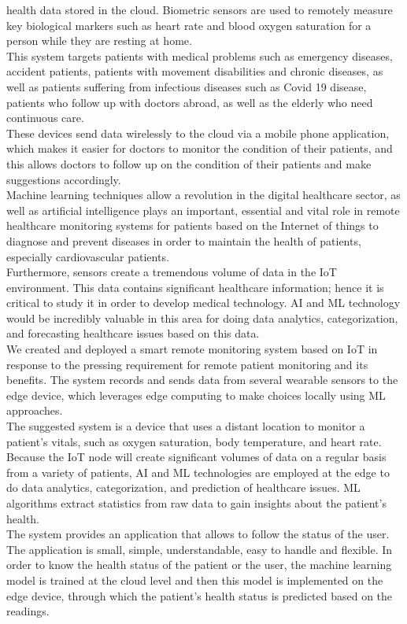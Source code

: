 \documentclass{bmcart}
\begin{document}
health data stored in the cloud. Biometric sensors are used to remotely measure
key biological markers such as heart rate and blood oxygen saturation for a
person while they are resting at home.\\
This system targets patients with medical problems such as emergency diseases,
accident patients, patients with movement disabilities and chronic diseases, as
well as patients suffering from infectious diseases such as Covid 19 disease,
patients who follow up with doctors abroad, as well as the elderly who need
continuous care.\\
These devices send data wirelessly to the cloud via a mobile phone application,
which makes it easier for doctors to monitor the condition of their patients,
and this allows doctors to follow up on the condition of their patients and make
suggestions accordingly.\\
Machine learning techniques allow a revolution in the digital healthcare sector,
as well as artificial intelligence plays an important, essential and vital role
in remote healthcare monitoring systems for patients based on the Internet of
things to diagnose and prevent diseases in order to maintain the health of
patients, especially cardiovascular patients.\\
Furthermore, sensors create a tremendous volume of data in the IoT environment.
This data contains significant healthcare information; hence it is critical to
study it in order to develop medical technology. AI and ML technology would be
incredibly valuable in this area for doing data analytics, categorization, and
forecasting healthcare issues based on this data.\\
We created and deployed a smart remote monitoring system based on IoT in
response to the pressing requirement for remote patient monitoring and its
benefits. The system records and sends data from several wearable sensors to the
edge device, which leverages edge computing to make choices locally using ML
approaches.\\
The suggested system is a device that uses a distant location to monitor a
patient's vitals, such as oxygen saturation, body temperature, and heart rate.\\
Because the IoT node will create significant volumes of data on a regular basis
from a variety of patients, AI and ML technologies are employed at the edge to
do data analytics, categorization, and prediction of healthcare issues. ML
algorithms extract statistics from raw data to gain insights about the patient's
health.\\
The system provides an application that allows to follow the status of the user.
The application is small, simple, understandable, easy to handle and flexible.
In order to know the health status of the patient or the user, the machine
learning model is trained at the cloud level and then this model is implemented
on the edge device, through which the patient's health status is predicted based
on the readings.\\
\end{document}
